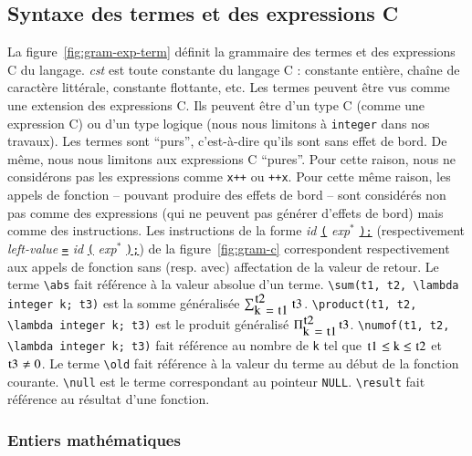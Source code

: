 \subsection{Syntaxe des termes \eacsl et des expressions C}



La figure~\ref{fig:gram-exp-term} définit la grammaire des termes \eacsl et des
expressions C du langage.
\textit{cst} est toute constante du langage C : constante entière, chaîne de
caractère littérale, constante flottante, etc.
Les termes \eacsl peuvent être vus comme une extension des expressions C.
Ils peuvent être d'un type C (comme une expression C) ou d'un type logique (nous
nous limitons à \lstinline'integer' dans nos travaux).
Les termes sont ``purs'', c'est-à-dire qu'ils sont sans effet de bord.
De même, nous nous limitons aux expressions C ``pures''.
Pour cette raison, nous ne considérons pas les expressions comme \lstinline'x++'
ou \lstinline'++x'.
Pour cette même raison, les appels de fonction -- pouvant produire des effets 
de bord -- sont considérés non pas comme des expressions (qui ne peuvent pas
générer d'effets de bord) mais comme des instructions.
Les instructions de la forme \textit{id} \underline{\lstinline'('}
\textit{exp}$^{*}$ \underline{\lstinline');'} (respectivement
\textit{left-value} \underline{\lstinline'='} \textit{id}
\underline{\lstinline'('} \textit{exp}$^{*}$ \underline{\lstinline');'}) de la
figure~\ref{fig:gram-c} correspondent respectivement aux appels de fonction sans
(resp. avec) affectation de la valeur de retour.
Le terme \lstinline'\abs' fait référence à la valeur absolue d'un terme.
\lstinline'\sum(t1, t2, \lambda integer k; t3)' est la somme généralisée
$\sum_{\mbox{\lstinline'k = t1'}}^{\mbox{\lstinline't2'}}\mbox{\lstinline't3'}$.
\lstinline'\product(t1, t2, \lambda integer k; t3)' est le produit
généralisé $\Pi_{\mbox{\lstinline'k = t1'}}^{\mbox{\lstinline't2'}}\mbox{\lstinline't3'}$.
\lstinline'\numof(t1, t2, \lambda integer k; t3)' fait référence au nombre de
\lstinline'k' tel que
$\mbox{\lstinline't1'} \le \mbox{\lstinline'k'} \le \mbox{\lstinline't2'}$ et
$\mbox{\lstinline't3'} \neq 0$.
Le terme \lstinline'\old' fait référence à la valeur du terme au début de la
fonction courante.
\lstinline'\null' est le terme correspondant au pointeur \lstinline'NULL'.
\lstinline{\result} fait référence au résultat d'une fonction.


\subsubsection{Entiers mathématiques}
\label{sec:eacsl-integers}


